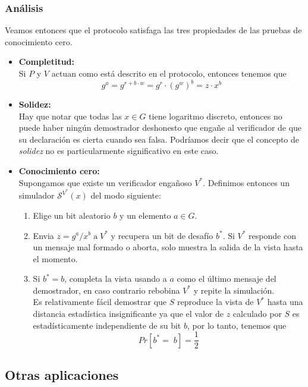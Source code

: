 \documentclass[oneside,10pt]{article}
\begin{document}
\subsubsection{Análisis}
Veamos entonces que el protocolo satisfaga las tres propiedades de las pruebas de conocimiento cero.
\begin{itemize}
\item \textbf{Completitud:}\\
  Si $P$ y $V$ actuan como está descrito en el protocolo, entonces tenemos que
  \[g^a = g^{r+b \cdot w} = g ^r \cdot (g^w)^b = z \cdot x^b \]
\item \textbf{Solidez:}\\
  Hay que notar que todas las $x \in G$ tiene logaritmo discreto, entonces no puede haber ningún demostrador deshonesto que engañe al verificador de que su declaración es cierta cuando sea falsa. Podríamos decir que el concepto de \emph{solidez} no es particularmente significativo en este caso.
\item \textbf{Conocimiento cero:}\\
  Supongamos que existe un verificador engañoso $V^*$. Definimos entonces un simulador $\mathcal{S}^{V^*}(x)$ del modo siguiente:
  \begin{enumerate}
  \item Elige un bit aleatorio $b$ y un elemento $a \in G$.
  \item Envia $z = g^a/x^b \;\mathrm{a}\; V^*$ y recupera un bit de desafío $b^*$. Si $V^*$ responde con un mensaje mal formado o aborta, solo muestra la salida de la vista hasta el momento.
  \item Si $b^* = b$, completa la vista usando a $a$ como el último mensaje del demostrador, en caso contrario rebobina $V^*$ y repite la simulación.\\

    Es relativamente fácil demostrar que $S$ reproduce la vista de $V^*$ hasta una distancia estadística insignificante ya que el valor de $z$ calculado por $S$ es estadísticamente independiente de su bit $b$, por lo tanto, tenemos que \[Pr[b^* = \; b ] = \frac{1}{2}\] 
  \end{enumerate}
\end{itemize}

\subsection{Otras aplicaciones}
\end{document}
